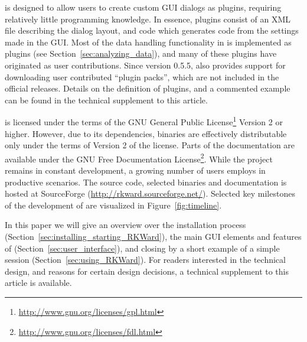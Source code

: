  is designed to allow users to create custom GUI dialogs as plugins, requiring relatively
little programming knowledge. In essence,  plugins consist of an XML file describing
the dialog layout, and  code which generates  code from the settings
made in the GUI. Most of the data handling functionality in  is implemented as plugins
(see Section~\ref{sec:analyzing_data}), and many of these plugins have originated as user contributions.
Since version 0.5.5,  also provides support for downloading user contributed ``plugin packs'',
which are not included in the official  releases. Details on the definition of plugins,
and a commented example can be found in the technical supplement to this article.

 is licensed under the terms of the GNU General Public License\footnote{\url{http://www.gnu.org/licenses/gpl.html}} Version 2
or higher. However, due to its dependencies,  binaries are effectively
distributable only under the terms of Version 2 of the license. Parts of the documentation are available under the
GNU Free Documentation License\footnote{\url{http://www.gnu.org/licenses/fdl.html}}. While the project remains in constant development, a growing
number of users employs  in productive scenarios. The source code,
selected binaries and documentation is hosted at SourceForge
(\url{http://rkward.sourceforge.net/}). Selected key milestones of the development of  are
visualized in Figure~\ref{fig:timeline}.

In this paper we will give an overview over the installation process (Section~\ref{sec:installing_starting_RKWard}), the main GUI elements and
features of  (Section~\ref{sec:user_interface}), and closing by a short example 
of a simple  session (Section~\ref{sec:using_RKWard}). For readers interested in the technical
design, and reasons for certain design decisions, a technical supplement to this article
is available.

